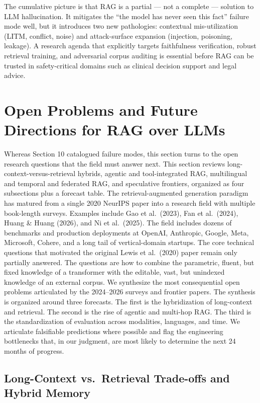 The cumulative picture is that RAG is a partial --- not a complete --- solution to LLM hallucination. It mitigates the ``the model has never seen this fact'' failure mode well, but it introduces two new pathologies: contextual mis-utilization (LITM, conflict, noise) and attack-surface expansion (injection, poisoning, leakage). A research agenda that explicitly targets faithfulness verification, robust retrieval training, and adversarial corpus auditing is essential before RAG can be trusted in safety-critical domains such as clinical decision support and legal advice.

\section{Open Problems and Future Directions for RAG over LLMs}\label{open-problems-and-future-directions-for-rag-over-llms}

Whereas Section 10 catalogued failure modes, this section turns to the open research questions that the field must answer next. This section reviews long-context-versus-retrieval hybrids, agentic and tool-integrated RAG, multilingual and temporal and federated RAG, and speculative frontiers, organized as four subsections plus a forecast table. The retrieval-augmented generation paradigm has matured from a single 2020 NeurIPS paper into a research field with multiple book-length surveys. Examples include Gao et al.~(2023), Fan et al.~(2024), Huang \& Huang (2026), and Ni et al.~(2025). The field includes dozens of benchmarks and production deployments at OpenAI, Anthropic, Google, Meta, Microsoft, Cohere, and a long tail of vertical-domain startups. The core technical questions that motivated the original Lewis et al.~(2020) paper remain only partially answered. The questions are how to combine the parametric, fluent, but fixed knowledge of a transformer with the editable, vast, but unindexed knowledge of an external corpus. We synthesize the most consequential open problems articulated by the 2024--2026 surveys and frontier papers. The synthesis is organized around three forecasts. The first is the hybridization of long-context and retrieval. The second is the rise of agentic and multi-hop RAG. The third is the standardization of evaluation across modalities, languages, and time. We articulate falsifiable predictions where possible and flag the engineering bottlenecks that, in our judgment, are most likely to determine the next 24 months of progress.

\subsection{Long-Context vs.~Retrieval Trade-offs and Hybrid Memory}\label{long-context-vs.-retrieval-trade-offs-and-hybrid-memory}

